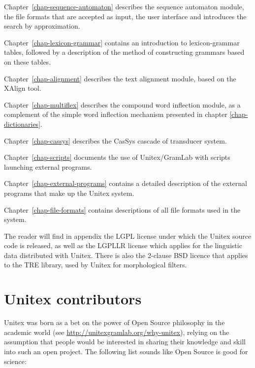 \bigskip \noindent Chapter~\ref{chap-sequence-automaton} describes the sequence automaton module, the file formats that are accepted as input, the user interface and introduces the search by approximation.

\bigskip \noindent Chapter~\ref{chap-lexicon-grammar} contains an
introduction to lexicon-grammar tables, followed by a description of the method of constructing grammars based on these
tables.

\bigskip \noindent Chapter~\ref{chap-alignment} describes the text
alignment module, based on the XAlign tool.

\bigskip \noindent Chapter~\ref{chap-multiflex} describes the compound word
inflection module, as a complement of the simple word inflection mechanism
presented in chapter \ref{chap-dictionaries}.

\bigskip \noindent Chapter~\ref{chap-cassys} describes the CasSys cascade of transducer system.

\bigskip \noindent Chapter~\ref{chap-scripts} documents the use of Unitex/GramLab
with scripts launching external programs.

\bigskip \noindent Chapter~\ref{chap-external-programs} contains a
detailed description of the external programs that make up the Unitex system.

\bigskip \noindent Chapter~\ref{chap-file-formats} contains
descriptions of all file formats used in the system. 


\bigskip \noindent The reader will find in appendix the LGPL license
under which the Unitex source code is released, as well as the LGPLLR license
which applies for the linguistic data distributed with Unitex. There is also
the 2-clause BSD licence that applies to the TRE library, used by Unitex for 
morphological filters.


\section*{Unitex contributors}
Unitex was born as a bet on the power of Open Source philosophy in the academic
world (see \url{http://unitexgramlab.org/why-unitex}), 
relying on the assumption that people would be interested in sharing
their knowledge and skill into such an open project. The following list
sounds like Open Source is good for science:

